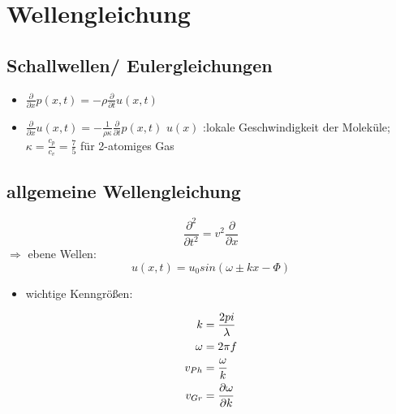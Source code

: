 \documentclass[10pt,a4paper]{article}
\author{Erik Zimmermann}
\begin{document}
\section{Wellengleichung}
\subsection{Schallwellen/ Eulergleichungen}
\begin{itemize}
\item $\frac{\partial}{\partial x} p(x,t)= -\rho \frac{\partial}{\partial t} u(x,t)$ \newline
\item $\frac{\partial}{\partial x} u(x,t)= -\frac{1}{\rho \kappa} \frac{\partial}{\partial t} p(x,t)$ \newline
$u(x)$ :lokale Geschwindigkeit der Moleküle; $\kappa= \frac{c_p}{c_v}= \frac{7}{5}$ für 2-atomiges Gas
\end{itemize}
\subsection{allgemeine Wellengleichung}
\begin{equation}
\frac{\partial^2}{\partial t^2}=v^2 \frac{\partial}{\partial x}
\end{equation}
$\Rightarrow$ ebene Wellen:\newline
\begin{equation}
u(x,t)=u_0 sin(\omega\pm kx-\Phi)
\end{equation}
\newline
\begin{itemize}
\item wichtige Kenngrößen:
\end{itemize}
\begin{align}
k&=\frac{2 pi}{\lambda}\notag\\
\omega&=2 \pi f\notag\\
v_{Ph}&=\frac{\omega}{k}\notag\\
v_{Gr}&=\frac{\partial \omega}{\partial k}\notag
\end{align}
\end{document}
